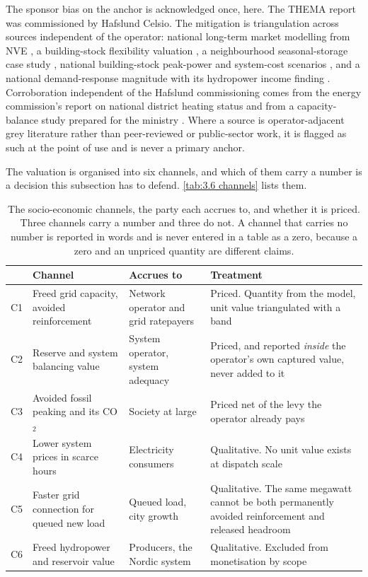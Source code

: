 The sponsor bias on the anchor is acknowledged once, here. The THEMA report was commissioned by Hafslund Celsio. The mitigation is triangulation across sources independent of the operator: national long-term market modelling from NVE \cite{nve_utviklingen_2024}, a building-stock flexibility valuation \cite{rosnes_energifleksible_2023}, a neighbourhood seasonal-storage case study \cite{kauko_assessing_2022}, national building-stock peak-power and system-cost scenarios \cite{SINTEF_energy_2023}, and a national demand-response magnitude with its hydropower income finding \cite{ahang_analysis_2025}. Corroboration independent of the Hafslund commissioning comes from the energy commission's report on national district heating status \cite{energikommisjonen_mer_2023} and from a capacity-balance study prepared for the ministry \cite{thema_consulting_group_har_2022}. Where a source is operator-adjacent grey literature rather than peer-reviewed or public-sector work, it is flagged as such at the point of use and is never a primary anchor.

The valuation is organised into six channels, and which of them carry a number is a decision this subsection has to defend. \autoref{tab:3.6 channels} lists them.

\begin{table}[h]
\centering
\caption{The socio-economic channels, the party each accrues to, and whether it is priced. Three channels carry a number and three do not. A channel that carries no number is reported in words and is never entered in a table as a zero, because a zero and an unpriced quantity are different claims.}
\small
\begin{tabular}{p{0.8cm} p{4.0cm} p{3.2cm} p{6.2cm}}
\toprule
& \textbf{Channel} & \textbf{Accrues to} & \textbf{Treatment} \\
\midrule
C1 & Freed grid capacity, avoided reinforcement & Network operator and grid ratepayers & Priced. Quantity from the model, unit value triangulated with a band \\
C2 & Reserve and system balancing value & System operator, system adequacy & Priced, and reported \emph{inside} the operator's own captured value, never added to it \\
C3 & Avoided fossil peaking and its CO$_2$ & Society at large & Priced net of the levy the operator already pays \\
C4 & Lower system prices in scarce hours & Electricity consumers & Qualitative. No unit value exists at dispatch scale \\
C5 & Faster grid connection for queued new load & Queued load, city growth & Qualitative. The same megawatt cannot be both permanently avoided reinforcement and released headroom \\
C6 & Freed hydropower and reservoir value & Producers, the Nordic system & Qualitative. Excluded from monetisation by scope \\
\bottomrule
\end{tabular}
\label{tab:3.6 channels}
\end{table}

